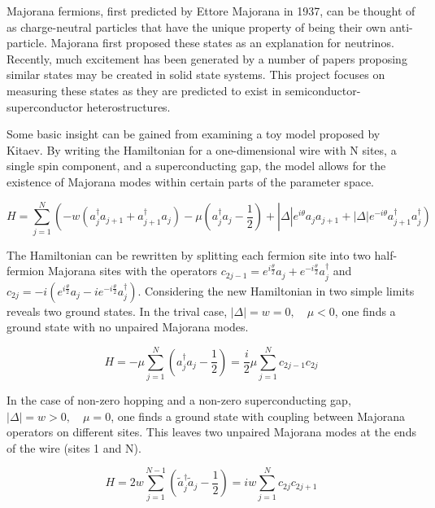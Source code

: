 Majorana fermions, first predicted by Ettore Majorana in 1937\cite{Majorana1937}, can be thought of as charge-neutral particles that have the unique property of being their own anti-particle. Majorana first proposed these states as an explanation for neutrinos. Recently, much excitement has been generated by a number of papers proposing similar states may be created in solid state systems\cite{Lutchyn2010, Alicea2010}. This project focuses on measuring these states as they are predicted to exist in semiconductor-superconductor heterostructures.

Some basic insight can be gained from examining a toy model proposed by Kitaev\cite{Kitaev2001}.  By writing the Hamiltonian for a one-dimensional wire with N sites, a single spin component, and a superconducting gap, the model allows for the existence of Majorana modes within certain parts of the parameter space.  

\begin{equation}
	H = \sum_{j=1}^{N}\left(-w\left(a_j^\dagger a_{j+1}+a_{j+1}^\dagger a_j\right)-\mu\left( a_j^\dagger a_{j} -\frac{1}{2}\right) + \right| \Delta \left| e^{i\theta} a_ja_{j+1} + \left|\Delta\right|e^{-i\theta} a_{j+1}^\dagger a_j^\dagger\right)
\end{equation}

The Hamiltonian can be rewritten by splitting each fermion site into two half-fermion Majorana sites with the operators $c_{2j-1}=e^{i\frac{\theta}{2}}a_j+e^{-i\frac{\theta}{2}}a_j^\dagger$ and $c_{2j}=-i\left(e^{i\frac{\theta}{2}}a_j-ie^{-i\frac{\theta}{2}}a_j^\dagger\right)$.  Considering the new Hamiltonian in two simple limits reveals two ground states. In the trival case, $\left|\Delta\right| = w = 0,\quad \mu < 0$, one finds a ground state with no unpaired Majorana modes.

\begin{equation}
	H = -\mu\sum_{j=1}^{N}\left(a_j^\dagger a_j - \frac{1}{2}\right) = \frac{i}{2}\mu \sum_{j=1}^{N} c_{2j-1}c_{2j}
\end{equation}

In the case of non-zero hopping and a non-zero superconducting gap, $\left|\Delta\right| = w > 0,\quad \mu = 0$, one finds a ground state with coupling between Majorana operators on different sites.  This leaves two unpaired Majorana modes at the ends of the wire (sites 1 and N).  

\begin{equation}
	H = 2w\sum_{j=1}^{N-1}\left(\tilde{a}_j^\dagger \tilde{a}_j - \frac{1}{2}\right) = iw\sum_{j=1}^{N} c_{2j}c_{2j+1}
\end{equation}

